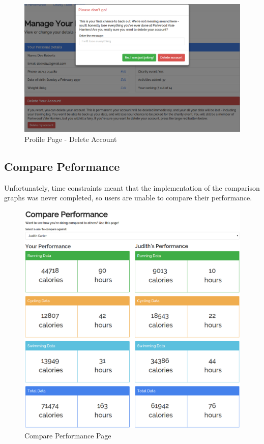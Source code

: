 \documentclass{article}[12pt,a4paper]
\begin{document}
\begin{figure}[h!]
  \includegraphics[scale=0.35]{final_ui/account_delete}
  \caption{Profile Page - Delete Account}
\end{figure}
\clearpage

\subsection{Compare Peformance}
Unfortunately, time constraints meant that the implementation of the comparison graphs was never completed, so users are unable to compare their performance. 

\begin{figure}[h!]
  \includegraphics[scale=0.35]{final_ui/compare_performance}
  \caption{Compare Performance Page}
\end{figure}
\end{document}

